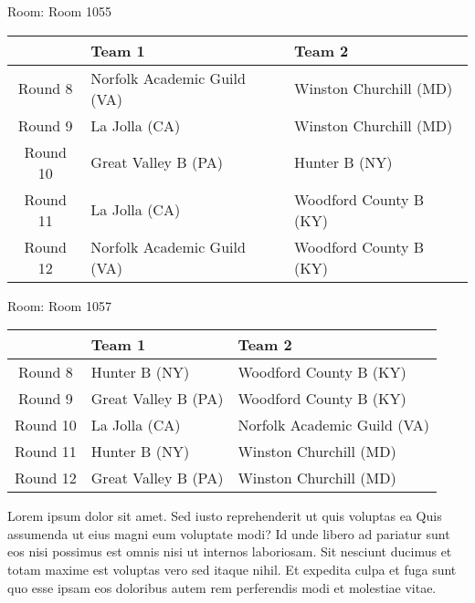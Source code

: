 \documentclass{article}%
\begin{document}
\vspace*{8pt}%
\linebreak%
\begin{flushleft}%
\begin{Large}%
Room: Room 1055%
\end{Large}%
\end{flushleft}%
\begin{tabularx}{\textwidth}{|c|Y|Y|}%
\hline%
&Team 1&Team 2\\%
\hline%
Round 8&Norfolk Academic Guild (VA)&Winston Churchill (MD)\\%
Round 9&La Jolla (CA)&Winston Churchill (MD)\\%
Round 10&Great Valley B (PA)&Hunter B (NY)\\%
Round 11&La Jolla (CA)&Woodford County B (KY)\\%
Round 12&Norfolk Academic Guild (VA)&Woodford County B (KY)\\%
\hline%
\end{tabularx}%
\vspace*{8pt}%
\linebreak%
\begin{flushleft}%
\begin{Large}%
Room: Room 1057%
\end{Large}%
\end{flushleft}%
\begin{tabularx}{\textwidth}{|c|Y|Y|}%
\hline%
&Team 1&Team 2\\%
\hline%
Round 8&Hunter B (NY)&Woodford County B (KY)\\%
Round 9&Great Valley B (PA)&Woodford County B (KY)\\%
Round 10&La Jolla (CA)&Norfolk Academic Guild (VA)\\%
Round 11&Hunter B (NY)&Winston Churchill (MD)\\%
Round 12&Great Valley B (PA)&Winston Churchill (MD)\\%
\hline%
\end{tabularx}%
\vspace*{8pt}%
\linebreak%
\newline%
Lorem ipsum dolor sit amet. Sed iusto reprehenderit ut quis voluptas ea Quis assumenda ut eius magni eum voluptate modi? Id unde libero ad pariatur sunt eos nisi possimus est omnis nisi ut internos laboriosam. Sit nesciunt ducimus et totam maxime est voluptas vero sed itaque nihil. Et expedita culpa et fuga sunt quo esse ipsam eos doloribus autem rem perferendis modi et molestiae vitae.\newline%
\end{document}
